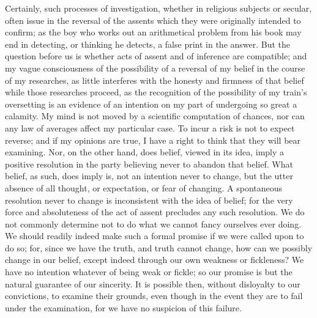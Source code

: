 Certainly, such processes of investigation, whether in religious
subjects or secular, often issue in the reversal of the assents which
they were originally intended to confirm; as the boy who works
out an arithmetical problem from his book may end in detecting, or
thinking he detects, a false print in the answer. But the question
before us is whether acts of assent and of inference are compatible;
and my vague consciousness of the possibility of a reversal of my
belief in the course of my researches, as little interferes with the
honesty and firmness of that belief while those researches proceed, as
the recognition of the possibility of my train's oversetting is an
evidence of an intention on my part of undergoing so great a calamity.
My mind is not moved by a scientific computation of chances, nor can
any law of averages affect my particular case. To incur a risk is not
to expect reverse; and if my opinions are true, I have a right to
think that they will bear examining. Nor, on the other hand, does
belief, viewed in its idea, imply a positive resolution in the party
believing never to abandon that belief. What belief, as such, does
imply is, not an intention never to change, but the utter absence of
all thought, or expectation, or fear of changing. A spontaneous
resolution never to change is inconsistent with the idea of belief;
for the very force and absoluteness of the act of assent precludes any
such resolution. We do not commonly determine not to do what we cannot
fancy ourselves ever doing. We should readily indeed make such a
formal promise if we were called upon to do so; for, since we have the
truth, and truth cannot change, how can we possibly change in our
belief, except indeed through our own weakness or fickleness? We have
no intention whatever of being weak or fickle; so our promise is but
the natural guarantee of our sincerity. It is possible then,
without disloyalty to our convictions, to examine their grounds, even
though in the event they are to fail under the examination, for we
have no suspicion of this failure.

